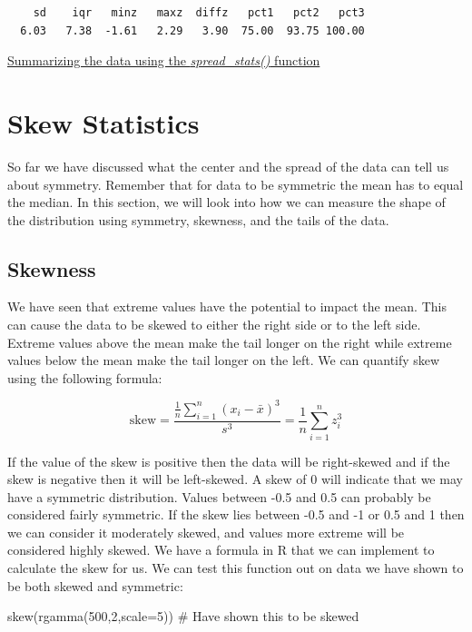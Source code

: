 \documentclass[
  letterpaper,
  DIV=11,
  numbers=noendperiod]{scrreprt}
\newenvironment{Shaded}{\begin{snugshade}}{\end{snugshade}}
\newcommand{\AttributeTok}[1]{\textcolor[rgb]{0.40,0.45,0.13}{#1}}
\newcommand{\CommentTok}[1]{\textcolor[rgb]{0.37,0.37,0.37}{#1}}
\newcommand{\DecValTok}[1]{\textcolor[rgb]{0.68,0.00,0.00}{#1}}
\newcommand{\FunctionTok}[1]{\textcolor[rgb]{0.28,0.35,0.67}{#1}}
\newcommand{\NormalTok}[1]{\textcolor[rgb]{0.00,0.23,0.31}{#1}}
\begin{document}
\begin{verbatim}
    sd    iqr   minz   maxz  diffz   pct1   pct2   pct3 
  6.03   7.38  -1.61   2.29   3.90  75.00  93.75 100.00 
\end{verbatim}

\begin{watch}{}{}
    \href{https://youtu.be/6WKsAQJTPTE}{Summarizing the data using the \textit{spread\_stats()} function}
\end{watch}

\section{Skew Statistics}\label{skew-statistics}

So far we have discussed what the center and the spread of the data can
tell us about symmetry. Remember that for data to be symmetric the mean
has to equal the median. In this section, we will look into how we can
measure the shape of the distribution using symmetry, skewness, and the
tails of the data.

\subsection{Skewness}\label{skewness}

We have seen that extreme values have the potential to impact the mean.
This can cause the data to be skewed to either the right side or to the
left side. Extreme values above the mean make the tail longer on the
right while extreme values below the mean make the tail longer on the
left. We can quantify skew using the following formula:

\[ \text{skew}=\frac{\frac{1}{n}\sum_{i=1}^n (x_i - \bar{x})^3}{s^3} = \frac{1}{n} \sum_{i=1}^n z_i^3 \]

If the value of the skew is positive then the data will be right-skewed
and if the skew is negative then it will be left-skewed. A skew of 0
will indicate that we may have a symmetric distribution. Values between
-0.5 and 0.5 can probably be considered fairly symmetric. If the skew
lies between -0.5 and -1 or 0.5 and 1 then we can consider it moderately
skewed, and values more extreme will be considered highly skewed. We
have a formula in R that we can implement to calculate the skew for us.
We can test this function out on data we have shown to be both skewed
and symmetric:

\begin{Shaded}
\begin{Highlighting}[]
\FunctionTok{skew}\NormalTok{(}\FunctionTok{rgamma}\NormalTok{(}\DecValTok{500}\NormalTok{,}\DecValTok{2}\NormalTok{,}\AttributeTok{scale=}\DecValTok{5}\NormalTok{)) }\CommentTok{\# Have shown this to be skewed}
\end{Highlighting}
\end{Shaded}
\end{document}
